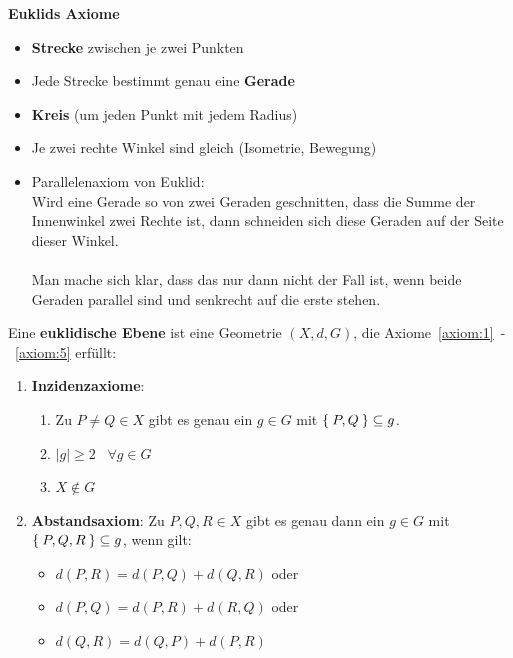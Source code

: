 \textbf{Euklids Axiome}
\begin{itemize}
    \item \textbf{Strecke} zwischen je zwei Punkten
    \item Jede Strecke bestimmt genau eine \textbf{Gerade}
    \item \textbf{Kreis} (um jeden Punkt mit jedem Radius)
    \item Je zwei rechte Winkel sind gleich (Isometrie, Bewegung)
    \item Parallelenaxiom von Euklid:\\
        Wird eine Gerade so von zwei Geraden geschnitten, dass die 
        Summe der Innenwinkel zwei Rechte ist, dann schneiden sich
        diese Geraden auf der Seite dieser Winkel.\\
        \\
        Man mache sich klar, dass das nur dann nicht der Fall ist, 
        wenn beide Geraden parallel sind und senkrecht auf die erste stehen.
\end{itemize}

\begin{definition}%
    Eine \textbf{euklidische Ebene} ist eine Geometrie $(X,d, G)$, die
    Axiome~\ref{axiom:1}~-~\ref{axiom:5} erfüllt:
    \begin{enumerate}[label=§\arabic*),ref=§\arabic*]
        \item \textbf{Inzidenzaxiome}:\label{axiom:1}
            \begin{enumerate}[label=(\roman*),ref=\theenumi{} (\roman*)]
                \item \label{axiom:1.1} Zu $P \neq Q \in X$ gibt es genau ein $g \in G$ mit
                      $\Set{P, Q} \subseteq g$.
                \item \label{axiom:1.2} $|g| \geq 2 \;\;\; \forall g \in G$
                \item \label{axiom:1.3} $X \notin G$
            \end{enumerate}
        \item \textbf{Abstandsaxiom}: Zu $P, Q, R \in X$ gibt es \label{axiom:2}
              genau dann ein $g \in G$ mit $\Set{P, Q, R} \subseteq g$,
              wenn gilt: 
              \begin{itemize}[]
                \item $d(P, R) = d(P, Q) + d(Q, R)$ oder
                \item $d(P, Q) = d(P, R) + d(R, Q)$ oder
                \item $d(Q, R) = d(Q, P) + d(P, R)$
              \end{itemize}
    \end{enumerate}
\end{definition}

